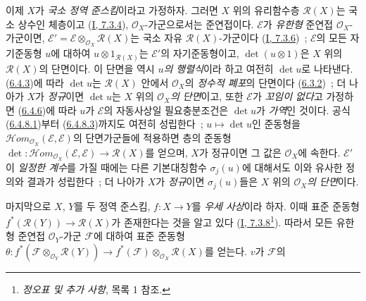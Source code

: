 \begin{env}[6.4.9]
\label{II.6.4.9-ko}
이제 $X$가 \emph{국소 정역 준스킴}이라고 가정하자. 그러면 $X$ 위의
유리함수층 $\mathcal{R}(X)$는 국소 상수인 체층이고
(\hyperref[I.7.3.4-ko]{I, 7.3.4}), $\mathcal{O}_X$-가군으로서는
준연접이다. $\mathcal{E}$가 \emph{유한형} 준연접
$\mathcal{O}_X$-가군이면,
$\mathcal{E}'=\mathcal{E}\otimes_{\mathcal{O}_X}\mathcal{R}(X)$는
국소 자유 $\mathcal{R}(X)$-가군이다
(\hyperref[I.7.3.6-ko]{I, 7.3.6})~; $\mathcal{E}$의 모든 자기준동형
$u$에 대하여 $u\otimes1_{\mathcal{R}(X)}$는 $\mathcal{E}'$의
자기준동형이고, $\det(u\otimes1)$은 $X$ 위의 $\mathcal{R}(X)$의
단면이다. 이 단면을 역시 \emph{$u$의 행렬식}이라 하고 여전히
$\det u$로 나타낸다. (\hyperref[II.6.4.3-ko]{6.4.3})에 따라
$\det u$는 $\mathcal{R}(X)$ 안에서 $\mathcal{O}_X$의
\emph{정수적 폐포}의 단면이다
(\hyperref[II.6.3.2-ko]{6.3.2})~; 더 나아가 $X$가 \emph{정규}이면
$\det u$는 $X$ 위의 \emph{$\mathcal{O}_X$의 단면}이고, 또한
$\mathcal{E}$가 \emph{꼬임이 없다}고 가정하면
(\hyperref[II.6.4.6-ko]{6.4.6})에 따라 $u$가 $\mathcal{E}$의
자동사상일 필요충분조건은 $\det u$가 \emph{가역}인 것이다. 공식
(\hyperref[II.6.4.8.1-ko]{6.4.8.1})부터
(\hyperref[II.6.4.8.3-ko]{6.4.8.3})까지도 여전히 성립한다~;
$u\mapsto\det u$인 준동형을
$\mathcal{H}om_{\mathcal{O}_X}(\mathcal{E},\mathcal{E})$의
단면가군들에 적용하면 층의 준동형
$\det:\mathcal{H}om_{\mathcal{O}_X}(\mathcal{E},\mathcal{E})
\to\mathcal{R}(X)$를 얻으며, $X$가 정규이면 그 값은
$\mathcal{O}_X$에 속한다. $\mathcal{E}'$이 \emph{일정한 계수}를 가질
때에는 다른 기본대칭함수 $\sigma_j(u)$에 대해서도 이와 유사한 정의와
결과가 성립한다~; 더 나아가 $X$가 \emph{정규}이면 $\sigma_j(u)$들은
$X$ 위의 \emph{$\mathcal{O}_X$의 단면}이다.

마지막으로 $X$, $Y$를 두 정역 준스킴, $f:X\to Y$를 \emph{우세 사상}이라
하자. 이때 표준 준동형 $f^*(\mathcal{R}(Y))\to\mathcal{R}(X)$가
존재한다는 것을 알고 있다
(\hyperref[I.7.3.8-ko]{I, 7.3.8}\footnote{\emph{정오표 및 추가 사항},
목록 1 참조.}). 따라서 모든 유한형 준연접 $\mathcal{O}_Y$-가군
$\mathcal{F}$에 대하여 표준 준동형
$\theta:f^*(\mathcal{F}\otimes_{\mathcal{O}_Y}\mathcal{R}(Y))
\to f^*(\mathcal{F})\otimes_{\mathcal{O}_X}\mathcal{R}(X)$를 얻는다.
$v$가 $\mathcal{F}$의



\end{env}

